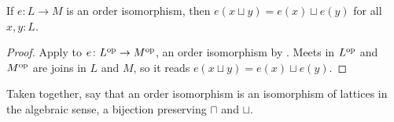 \begin{lemma}
  \label{presJoin}
  If $e \colon L \to M$ is an order isomorphism, then $e(x \sqcup y) = e(x) \sqcup e(y)$ for all $x, y : L$.
\end{lemma}
\begin{proof}
  Apply  to $e \colon L^{\mathrm{op}} \to M^{\mathrm{op}}$, an order isomorphism by . Meets in $L^{\mathrm{op}}$ and $M^{\mathrm{op}}$ are joins in $L$ and $M$, so it reads $e(x \sqcup y) = e(x) \sqcup e(y)$.
\end{proof}

Taken together,  say that an order isomorphism is an isomorphism of lattices in the algebraic sense, a bijection preserving $\sqcap$ and $\sqcup$.

